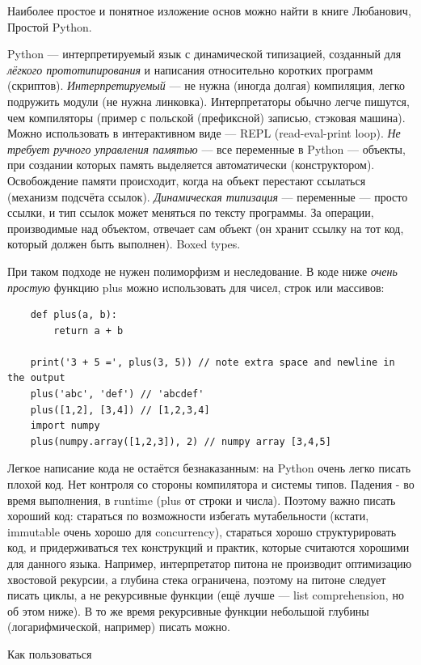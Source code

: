 \documentclass{book}
\begin{document}
Наиболее простое и понятное изложение основ можно найти в книге Любанович, Простой Python.

Python --- интерпретируемый язык с динамической типизацией, созданный для \textit{лёгкого прототипирования} и написания относительно
коротких программ (скриптов).  \textit{Интерпретируемый} --- не нужна (иногда долгая) компиляция, легко подружить модули (не нужна
линковка). Интерпретаторы обычно легче пишутся, чем компиляторы (пример с польской (префиксной) записью, стэковая машина). Можно
использовать в интерактивном виде --- REPL (read-eval-print loop). \textit{Не требует ручного управления памятью} --- все переменные в
Python --- объекты, при создании которых память выделяется автоматически (конструктором). Освобождение памяти происходит, когда на объект
перестают ссылаться (механизм подсчёта ссылок). \textit{Динамическая типизация} --- переменные --- просто ссылки, и тип ссылок может
меняться по тексту программы. За операции, производимые над объектом, отвечает сам объект (он хранит ссылку на тот код, который должен быть
выполнен). Boxed types.

При таком подходе не нужен полиморфизм и неследование. В коде ниже \textit{очень простую} функцию plus можно использовать для чисел, строк
или массивов:
\begin{verbatim}
    def plus(a, b):
        return a + b

    print('3 + 5 =', plus(3, 5)) // note extra space and newline in the output
    plus('abc', 'def') // 'abcdef'
    plus([1,2], [3,4]) // [1,2,3,4]
    import numpy
    plus(numpy.array([1,2,3]), 2) // numpy array [3,4,5]
\end{verbatim}

Легкое написание кода не остаётся безнаказанным: на Python очень легко писать плохой код. Нет контроля со стороны компилятора и системы
типов. Падения - во время выполнения, в runtime (plus от строки и числа). Поэтому важно писать хороший код: стараться по возможности
избегать мутабельности (кстати, immutable очень хорошо для concurrency), стараться хорошо структурировать код, и придерживаться тех
конструкций и практик, которые считаются хорошими для данного языка. Например, интерпретатор питона не производит оптимизацию хвостовой
рекурсии, а глубина стека ограничена, поэтому на питоне следует писать циклы, а не рекурсивные функции (ещё лучше --- list comprehension, но
об этом ниже). В то же время рекурсивные функции небольшой глубины (логарифмической, например)
писать можно.

{Как пользоваться}
\end{document}
